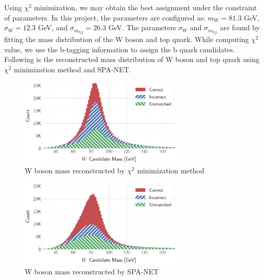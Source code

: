 Using $\chi^{2}$ minimization, we may obtain the best assignment under the constraint of parameters. In this project, the parameters are configured as: $m_{W}=81.3$ GeV, $\sigma_{W} = 12.3$ GeV, and $\sigma_{m_{bjj}}=26.3$ GeV. The parameters $\sigma_{W}$ and $\sigma_{m_{bjj}}$ are found by fitting the mass distribution of the W boson and top quark. While computing $\chi^{2}$ value, we use the b-tagging information to assign the b quark candidates. 
\\
Following is the reconstructed mass distribution of W boson and top quark using $\chi^{2}$ minimization method and SPA-NET.
\\
\begin{figure}[H]
	\centering
	\includegraphics[width=0.7\textwidth]{Figures/network_w_quark_stacked_chi2.pdf}
	\caption{W boson mass reconstructed by $\chi^{2}$ minimization method}
	\label{fig: chi2 reco Wboson}
\end{figure}
\begin{figure}[H]
	\centering
	\includegraphics[width=0.7\textwidth]{Figures/network_w_quark_stacked.pdf}
	\caption{W boson mass reconstructed by SPA-NET}
	\label{fig: spanet reco Wboson}
\end{figure}

